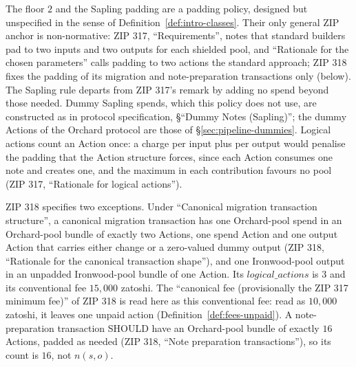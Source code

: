 \documentclass[11pt,a4paper]{article}
\theoremstyle{definition}
\begin{document}
The floor $2$ and the Sapling padding are a padding policy, designed but
unspecified in the sense of Definition~\ref{def:intro-classes}. Their only
general ZIP anchor is non-normative: ZIP 317, ``Requirements'', notes that
standard builders pad to two inputs and two outputs for each shielded pool,
and ``Rationale for the chosen parameters'' calls padding to two actions the
standard approach; ZIP 318 fixes the padding of its migration and
note-preparation transactions only (below). The Sapling rule departs from
ZIP 317's remark by adding no spend beyond those needed.
Dummy Sapling spends, which this policy does not use, are constructed as in
protocol specification, \S``Dummy Notes (Sapling)''; the dummy Actions of
the Orchard protocol are those of \S\ref{sec:pipeline-dummies}. Logical
actions count an Action once: a charge per input plus per output would
penalise the padding that the Action structure forces, since each Action
consumes one note and creates one, and the maximum in each contribution
favours no pool (ZIP 317, ``Rationale for logical actions'').

ZIP 318 specifies two exceptions. Under ``Canonical migration transaction
structure'', a canonical migration transaction has one Orchard-pool spend in
an Orchard-pool bundle of exactly two Actions, one spend Action and one
output Action that carries either change or a zero-valued dummy output (ZIP
318, ``Rationale for the canonical transaction shape''), and one
Ironwood-pool output in an unpadded Ironwood-pool bundle of one Action. Its
$\mathit{logical\_actions}$ is $3$ and its conventional fee $15{,}000$
zatoshi. The ``canonical fee (provisionally the ZIP 317 minimum fee)'' of
ZIP 318 is read here as this conventional fee: read as $10{,}000$ zatoshi,
it leaves one unpaid action (Definition~\ref{def:fees-unpaid}). A
note-preparation transaction SHOULD have an Orchard-pool bundle of exactly
$16$ Actions, padded as needed (ZIP 318, ``Note preparation
transactions''), so its count is $16$, not $n(s, o)$.
\end{document}
